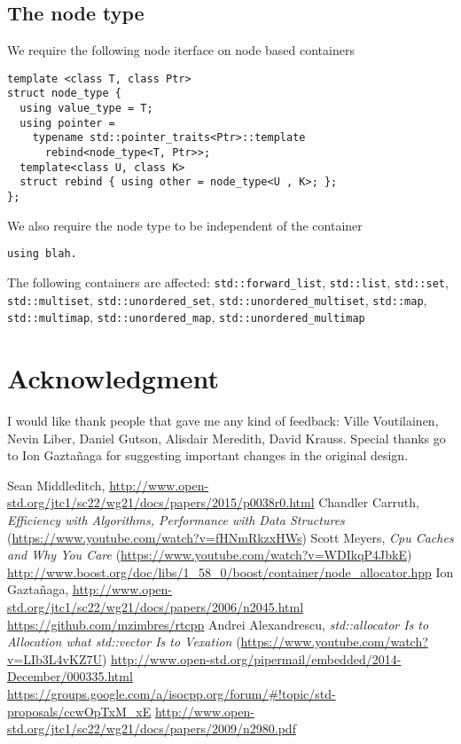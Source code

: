 \documentclass[11pt]{article}
\begin{document}
\subsection{The node type}

We require the following node iterface on node based containers

\medskip
\begin{lstlisting}
template <class T, class Ptr>
struct node_type {
  using value_type = T;
  using pointer =
    typename std::pointer_traits<Ptr>::template
      rebind<node_type<T, Ptr>>;
  template<class U, class K>
  struct rebind { using other = node_type<U , K>; };
};
\end{lstlisting}

We also require the node type to be independent of the container

\medskip
\begin{lstlisting}
using blah.
\end{lstlisting}

The following containers are affected: \texttt{std::forward\_list},
\texttt{std::list}, \texttt{std::set}, \texttt{std::multiset},
\texttt{std::unordered\_set}, \texttt{std::unordered\_multiset},
\texttt{std::map}, \texttt{std::multimap},
\texttt{std::unordered\_map}, \texttt{std::unordered\_multimap}

\section{Acknowledgment}

I would like thank people that gave me any kind of feedback: Ville Voutilainen,
Nevin Liber, Daniel Gutson, Alisdair Meredith, David Krauss. Special thanks go
to Ion Gaztañaga for suggesting important changes in the original design.

\begin{thebibliography}{9}

   Sean Middleditch, \url{http://www.open-std.org/jtc1/sc22/wg21/docs/papers/2015/p0038r0.html}
   Chandler Carruth, {\it Efficiency with Algorithms, Performance
  with Data Structures} (\url{https://www.youtube.com/watch?v=fHNmRkzxHWs})
   Scott Meyers, {\it Cpu Caches and Why You Care} (\url{https://www.youtube.com/watch?v=WDIkqP4JbkE})
   \url{http://www.boost.org/doc/libs/1_58_0/boost/container/node_allocator.hpp}
   Ion Gazta\~ naga, \url{http://www.open-std.org/jtc1/sc22/wg21/docs/papers/2006/n2045.html}
   \url{https://github.com/mzimbres/rtcpp}
   Andrei Alexandrescu, {\it std::allocator Is to Allocation what
  std::vector Is to Vexation} (\url{https://www.youtube.com/watch?v=LIb3L4vKZ7U})
   \url{http://www.open-std.org/pipermail/embedded/2014-December/000335.html}
   \url{https://groups.google.com/a/isocpp.org/forum/#!topic/std-proposals/ccwOpTxM_xE}
   \url{http://www.open-std.org/jtc1/sc22/wg21/docs/papers/2009/n2980.pdf}

\end{thebibliography}
\end{document}
